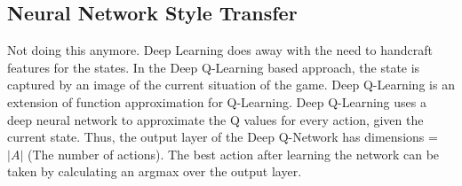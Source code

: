 \documentclass[10pt,twocolumn,letterpaper]{article}
\begin{document}
    
    
\subsection{Neural Network Style Transfer}
Not doing this anymore.
Deep Learning does away with the need to handcraft features for the states. In the Deep Q-Learning based approach, the state is captured by an image of the current situation of the game. %
Deep Q-Learning is an extension of function approximation for Q-Learning. Deep Q-Learning uses a deep neural network to approximate the Q values for every action, given the current state. Thus, the output layer of the Deep Q-Network has dimensions = $|A|$ (The number of actions). The best action after learning the network can be taken by calculating an argmax over the output layer. 
\end{document}

